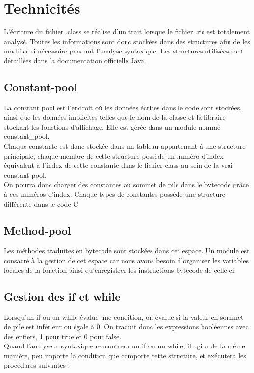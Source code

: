 \documentclass[12pt]{report}
\begin{document}
\section{Technicités}
L'écriture du fichier .class se réalise d'un trait lorsque le fichier .ris est totalement analysé. Toutes les informations sont donc stockées dans des structures afin de les modifier si nécessaire pendant l'analyse syntaxique. Les structures utilisées sont détaillées dans la documentation officielle Java.
\subsection{Constant-pool}
La constant pool est l'endroit où les données écrites dans le code sont stockées, ainsi que les données implicites telles que le nom de la classe et la libraire stockant les fonctions d'affichage. Elle est gérée dans un module nommé constant\_pool.\\
Chaque constante est donc stockée dans un tableau appartenant à une structure principale, chaque membre de cette structure possède un numéro d'index équivalent à l'index de cette constante dans le fichier class au sein de la vrai constant-pool.\\
On pourra donc charger des constantes au sommet de pile dans le bytecode grâce à ces numéros d'index.
Chaque types de constantes possède une structure différente dans le code C 
\subsection{Method-pool}
Les méthodes traduites en bytecode sont stockées dans cet espace. Un module est\\consacré à la gestion de cet espace car nous avons besoin d'organiser les variables locales de la fonction ainsi qu'enregistrer les instructions bytecode de celle-ci.
\subsection{Gestion des if et while}
Lorsqu'un if ou un while évalue une condition, on évalue si la valeur en sommet de pile est inférieur ou égale à 0.
On traduit donc les expressions booléennes avec des entiers, 1 pour true et 0 pour false.\\
Quand l'analyseur syntaxique rencontrera un if ou un while, il agira de la même manière, peu importe la condition que comporte cette structure, et exécutera les procédures suivantes :\\
\end{document}
